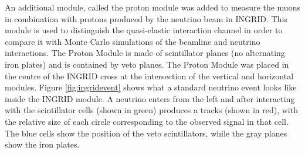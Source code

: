 An additional module, called the proton module was added to measure the muons in combination with protons produced by the neutrino beam in INGRID. This module is used to distinguish the quasi-elastic interaction channel in order to compare it with Monte Carlo simulations of the beamline and neutrino interactions. The Proton Module is made of scintillator planes (no alternating iron plates) and is contained by veto planes. The Proton Module was placed in the centre of the INGRID cross at the intersection of the vertical and horizontal modules. Figure \ref{fig:ingridevent} shows what a standard neutrino event looks like inside the INGRID module. A neutrino enters from the left and after interacting with the scintillator cells (shown in green) produces a tracks (shown in red), with the relative size of each circle corresponding to the observed signal in that cell. The blue cells show the position of the veto scintillators, while the gray planes show the iron plates. 